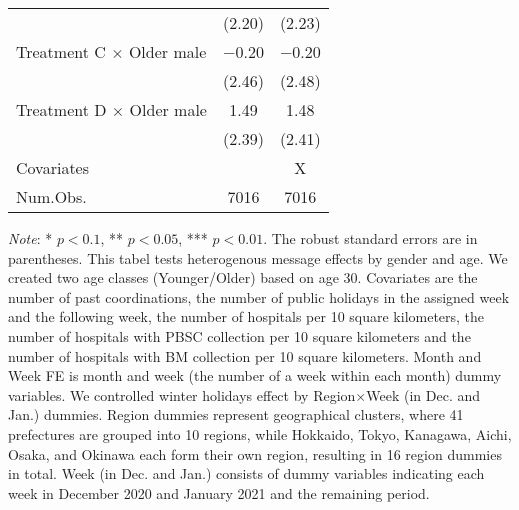 \documentclass[12pt, a4paper]{article}
\begin{document}
\begin{table}[H]
\begin{threeparttable}
\begin{tabular}[t]{lcc}
 & (\num{2.20}) & (\num{2.23})\\
Treatment C $\times$ Older male & \num{-0.20} & \num{-0.20}\\
 & (\num{2.46}) & (\num{2.48})\\
Treatment D $\times$ Older male & \num{1.49} & \num{1.48}\\
 & (\num{2.39}) & (\num{2.41})\\
\midrule
Covariates &  & X\\
Num.Obs. & \num{7016} & \num{7016}\\
\bottomrule
\end{tabular}
\begin{tablenotes}
\item \emph{Note}: * $p < 0.1$, ** $p < 0.05$, *** $p < 0.01$. The robust standard errors are in parentheses. This tabel tests heterogenous message effects by gender and age. We created two age classes (Younger/Older) based on age 30. Covariates are the number of past coordinations, the number of public holidays in the assigned week and the following week, the number of hospitals per 10 square kilometers, the number of hospitals with PBSC collection per 10 square kilometers and the number of hospitals with BM collection per 10 square kilometers. Month and Week FE is month and week (the number of a week within each month) dummy variables. We controlled winter holidays effect by Region$\times$Week (in Dec. and Jan.) dummies. Region dummies represent geographical clusters, where 41 prefectures are grouped into 10 regions, while Hokkaido, Tokyo, Kanagawa, Aichi, Osaka, and Okinawa each form their own region, resulting in 16 region dummies in total. Week (in Dec. and Jan.) consists of dummy variables indicating each week in December 2020 and January 2021 and the remaining period.
\end{tablenotes}
\end{threeparttable}
\end{table}
\end{document}
